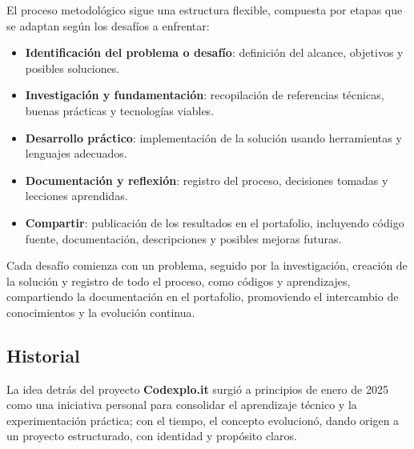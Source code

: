 \documentclass[10pt, a4paper, oneside]{article}
\begin{document}
El proceso metodológico sigue una estructura flexible, compuesta por etapas que se adaptan según los desafíos a enfrentar:

\begin{itemize}
  \item \textbf{Identificación del problema o desafío}: definición del alcance, objetivos y posibles soluciones.
  \item \textbf{Investigación y fundamentación}: recopilación de referencias técnicas, buenas prácticas y tecnologías viables.
  \item \textbf{Desarrollo práctico}: implementación de la solución usando herramientas y lenguajes adecuados.
  \item \textbf{Documentación y reflexión}: registro del proceso, decisiones tomadas y lecciones aprendidas.
  \item \textbf{Compartir}: publicación de los resultados en el portafolio, incluyendo código fuente, documentación, descripciones y posibles mejoras futuras.
\end{itemize}

Cada desafío comienza con un problema, seguido por la investigación, creación de la solución y registro de todo el proceso, como códigos y aprendizajes, compartiendo la documentación en el portafolio, promoviendo el intercambio de conocimientos y la evolución continua.

\subsection{Historial}

La idea detrás del proyecto \textbf{Codexplo.it} surgió a principios de enero de 2025 como una iniciativa personal para consolidar el aprendizaje técnico y la experimentación práctica; con el tiempo, el concepto evolucionó, dando origen a un proyecto estructurado, con identidad y propósito claros.
\end{document}
